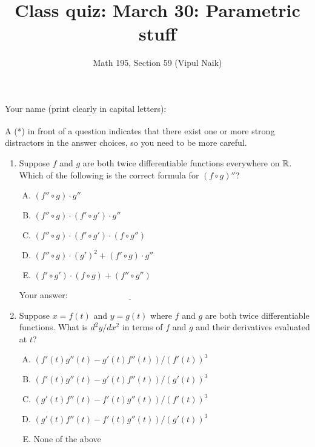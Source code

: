 \documentclass[10pt]{amsart}
\title{Class quiz: March 30: Parametric stuff}
\author{Math 195, Section 59 (Vipul Naik)}
\begin{document}
\maketitle

Your name (print clearly in capital letters): $\underline{\qquad\qquad\qquad\qquad\qquad\qquad\qquad\qquad\qquad\qquad}$

A (*) in front of a question indicates that there exist one or more
strong distractors in the answer choices, so you need to be more careful.
\begin{enumerate}

\item Suppose $f$ and $g$ are both twice differentiable functions
  everywhere on $\mathbb{R}$. Which of the following is the correct formula
  for $(f \circ g)''$?

  \begin{enumerate}[(A)]

  \item $(f'' \circ g) \cdot g''$
  \item $(f'' \circ g) \cdot (f' \circ g') \cdot g''$
  \item $(f'' \circ g) \cdot (f' \circ g') \cdot (f \circ g'')$
  \item $(f'' \circ g) \cdot (g')^2 + (f' \circ g) \cdot g''$
  \item $(f' \circ g') \cdot (f \circ g) + (f'' \circ g'')$
  \end{enumerate}

  \vspace{0.1in}
  Your answer: $\underline{\qquad\qquad\qquad\qquad\qquad\qquad\qquad}$
  \vspace{0.6in}

\item Suppose $x = f(t)$ and $y = g(t)$ where $f$ and $g$ are both
  twice differentiable functions. What is $d^2y/dx^2$ in terms of $f$
  and $g$ and their derivatives evaluated at $t$?

  \begin{enumerate}[(A)]
  \item $(f'(t)g''(t) - g'(t)f''(t))/(f'(t))^3$
  \item $(f'(t)g''(t) - g'(t)f''(t))/(g'(t))^3$
  \item $(g'(t)f''(t) - f'(t)g''(t))/(f'(t))^3$
  \item $(g'(t)f''(t) - f'(t)g''(t))/(g'(t))^3$
  \item None of the above
  \end{enumerate}


\end{enumerate}
\end{document}
